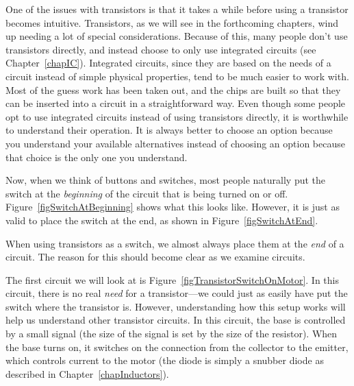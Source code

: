 One of the issues with transistors is that it takes a while before using a transistor becomes intuitive.
Transistors, as we will see in the forthcoming chapters, wind up needing a lot of special considerations.
Because of this, many people don't use transistors directly, and instead choose to only use integrated circuits (see Chapter~\ref{chapIC}).
Integrated circuits, since they are based on the needs of a circuit instead of simple physical properties, tend to be much easier to work with.
Most of the guess work has been taken out, and the chips are built so that they can be inserted into a circuit in a straightforward way.
Even though some people opt to use integrated circuits instead of using transistors directly, it is worthwhile to understand their operation.
It is always better to choose an option because you understand your available alternatives instead of choosing an option because that choice is the only one you understand.

Now, when we think of buttons and switches, most people naturally put the switch at the \emph{beginning} of the circuit that is being turned on or off.
Figure~\ref{figSwitchAtBeginning} shows what this looks like.
However, it is just as valid to place the switch at the end, as shown in Figure~\ref{figSwitchAtEnd}.


When using transistors as a switch, we almost always place them at the \emph{end} of a circuit.
The reason for this should become clear as we examine circuits.

The first circuit we will look at is Figure~\ref{figTransistorSwitchOnMotor}.
In this circuit, there is no real \emph{need} for a transistor---we could just as easily have put the switch where the transistor is.
However, understanding how this setup works will help us understand other transistor circuits.
In this circuit, the base is controlled by a small signal (the size of the signal is set by the size of the resistor).
When the base turns on, it switches on the connection from the collector to the emitter, which controls current to the motor (the diode is simply a snubber diode as described in Chapter~\ref{chapInductors}).


